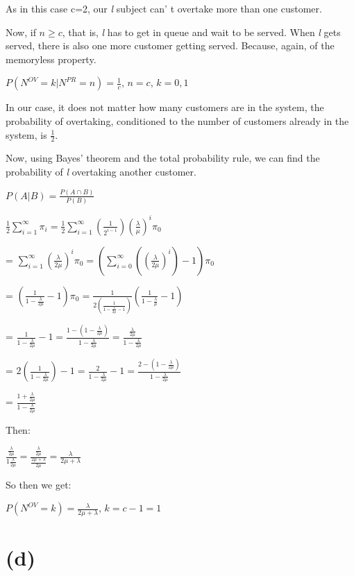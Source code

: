 \documentclass[]{article}
\begin{document}
As in this case c=2, our \emph{l} subject can' t overtake more than one
customer.

Now, if \(n \geq c\), that is, \emph{l} has to get in queue and wait to
be served. When \emph{l} gets served, there is also one more customer
getting served. Because, again, of the memoryless property.

\(P(N^{OV} = k | N^{PR} = n) = \frac{1}{c}\), \(n = c\), \(k = 0,1\)

In our case, it does not matter how many customers are in the system,
the probability of overtaking, conditioned to the number of customers
already in the system, is \(\frac{1}{2}\).

Now, using Bayes' theorem and the total probability rule, we can find
the probability of \emph{l} overtaking another customer.

\(P(A | B) = \frac{P(A \cap B)}{P(B)}\)

\(\frac{1}{2} \sum_{i=1}^{\infty} \pi_i = \frac{1}{2} \sum_{i=1}^{\infty} (\frac{1}{2^{i-1}}) (\frac{\lambda}{\mu})^{i} \pi_0\)

=
\(\sum_{i=1}^{\infty} (\frac{\lambda}{2 \mu})^i \pi_0 = (\sum_{i=0}^{\infty} ((\frac{\lambda}{2 \mu})^i) - 1) \pi_0\)

=
\((\frac{1}{1-\frac{\lambda}{2 \mu}} - 1) \pi_0 = \frac{1}{2 (\frac{1}{1 - \frac{\lambda}{2 \mu} - 1})} (\frac{1}{1 - \frac{\lambda}{\mu}} - 1)\)

=
\(\frac{1}{1 - \frac{\lambda}{2 \mu}} - 1 = \frac{1 - (1 - \frac{\lambda}{2 \mu})}{1 - \frac{\lambda}{2 \mu}} = \frac{\frac{\lambda}{2 \mu}}{1 - \frac{\lambda}{2 \mu}}\)

=
\(2 (\frac{1}{1 - \frac{\lambda}{2 \mu}}) - 1 = \frac{2}{1 - \frac{\lambda}{2 \mu}} - 1 = \frac{2 - (1 - \frac{\lambda}{2 \mu})}{1 - \frac{\lambda}{2 \mu}}\)

= \(\frac{1 + \frac{\lambda}{2 \mu}}{1 - \frac{\lambda}{2 \mu}}\)

Then:

\(\frac{\frac{\lambda}{2 \mu}}{1 \frac{\lambda}{2 \mu}} = \frac{\frac{\lambda}{2 \mu}}{\frac{2 \mu + \lambda}{2 \mu}} = \frac{\lambda}{2 \mu + \lambda}\)

So then we get:

\(P(N^{OV} = k) = \frac{\lambda}{2 \mu + \lambda}\), \(k = c-1 = 1\)

\hypertarget{d}{%
\section{(d)}\label{d}}
\end{document}
